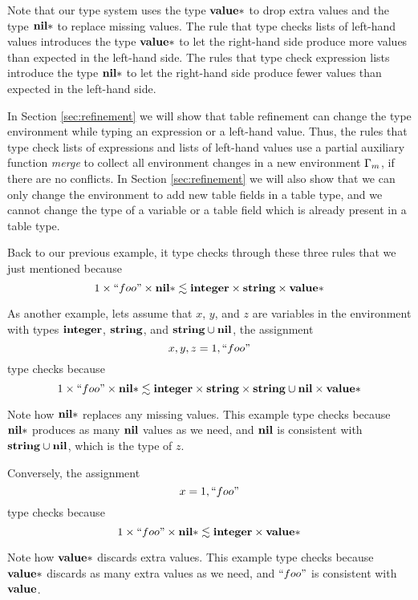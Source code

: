 Note that our type system uses the type $\mathbf{value}{*}$ to drop extra values
and the type $\mathbf{nil}{*}$ to replace missing values.
The rule that type checks lists of left-hand values introduces the type
$\mathbf{value}{*}$ to let the right-hand side produce more values than
expected in the left-hand side.
The rules that type check expression lists introduce the type
$\mathbf{nil}{*}$ to let the right-hand side produce fewer values than
expected in the left-hand side.

In Section \ref{sec:refinement} we will show that table refinement can
change the type environment while typing an expression or a left-hand value.
Thus, the rules that type check lists of expressions and lists of
left-hand values use a partial auxiliary function \emph{merge} to collect
all environment changes in a new environment $\Gamma_{m}$, if there are no conflicts.
In Section \ref{sec:refinement} we will also show that we can only change the
environment to add new table fields in a table type, and we cannot change the
type of a variable or a table field which is already present in a table type.

Back to our previous example, it type checks through these three rules
that we just mentioned because
\[
1 \times ``foo" \times \mathbf{nil}{*} \lesssim \mathbf{integer} \times \mathbf{string} \times \mathbf{value}{*}
\]

As another example, lets assume that $x$, $y$, and $z$ are variables in
the environment with types $\mathbf{integer}$, $\mathbf{string}$, and $\mathbf{string} \cup \mathbf{nil}$,
the assignment
\[
x, y, z = 1, ``foo"
\]
type checks because
\[
1 \times ``foo" \times \mathbf{nil}{*} \lesssim \mathbf{integer} \times \mathbf{string} \times \mathbf{string} \cup \mathbf{nil} \times \mathbf{value}{*}
\]

Note how $\mathbf{nil}{*}$ replaces any missing values.
This example type checks because $\mathbf{nil}{*}$ produces as many $\mathbf{nil}$
values as we need, and $\mathbf{nil}$ is consistent with $\mathbf{string} \cup \mathbf{nil}$,
which is the type of $z$.

Conversely, the assignment
\[
x = 1, ``foo"
\]
type checks because
\[
1 \times ``foo" \times \mathbf{nil}{*} \lesssim \mathbf{integer} \times \mathbf{value}{*}
\]

Note how $\mathbf{value}{*}$ discards extra values.
This example type checks because $\mathbf{value}{*}$ discards as many extra
values as we need, and $``foo"$ is consistent with $\mathbf{value}$.

